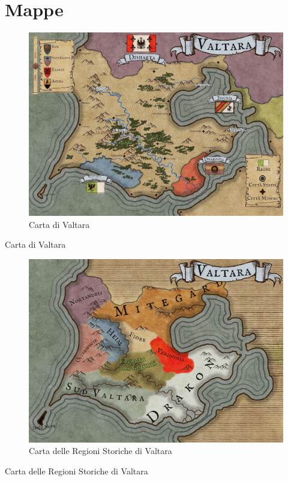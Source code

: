 \section{Mappe}\label{mappe}

\begin{figure}
\centering
\includegraphics{VAltara.jpg}
\caption{Carta di Valtara}
\end{figure}

Carta di Valtara

\begin{figure}
\centering
\includegraphics{VALTARA_REGIONI.jpg}
\caption{Carta delle Regioni Storiche di Valtara}
\end{figure}

Carta delle Regioni Storiche di Valtara

